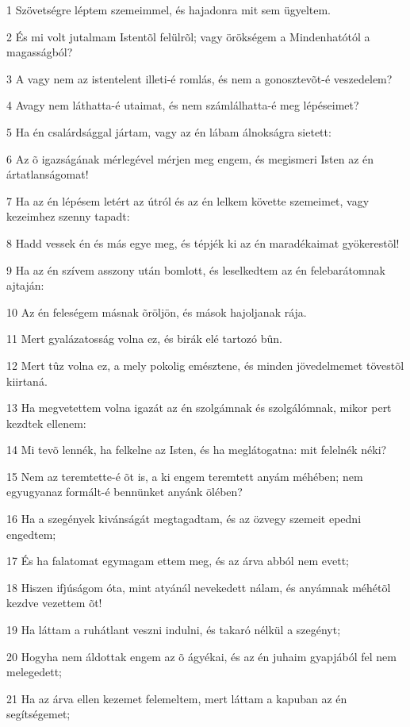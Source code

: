 \par 1 Szövetségre léptem szemeimmel, és hajadonra mit sem ügyeltem.
\par 2 És mi volt jutalmam Istentõl felülrõl; vagy örökségem a Mindenhatótól a magasságból?
\par 3 A vagy nem az istentelent illeti-é romlás, és nem a gonosztevõt-é veszedelem?
\par 4 Avagy nem láthatta-é utaimat, és nem számlálhatta-é meg lépéseimet?
\par 5 Ha én csalárdsággal jártam, vagy az én lábam álnokságra sietett:
\par 6 Az õ igazságának mérlegével mérjen meg engem, és megismeri Isten az én ártatlanságomat!
\par 7 Ha az én lépésem letért az útról és az én lelkem követte szemeimet, vagy kezeimhez szenny tapadt:
\par 8 Hadd vessek én és más egye meg, és tépjék ki az én maradékaimat gyökerestõl!
\par 9 Ha az én szívem asszony után bomlott, és leselkedtem az én felebarátomnak ajtaján:
\par 10 Az én feleségem másnak õröljön, és mások hajoljanak rája.
\par 11 Mert gyalázatosság volna ez, és birák elé tartozó bûn.
\par 12 Mert tûz volna ez, a mely pokolig emésztene, és minden jövedelmemet tövestõl kiirtaná.
\par 13 Ha megvetettem volna igazát az én szolgámnak és szolgálómnak, mikor pert kezdtek ellenem:
\par 14 Mi tevõ lennék, ha felkelne az Isten, és ha meglátogatna: mit felelnék néki?
\par 15 Nem az teremtette-é õt is, a ki engem teremtett anyám méhében; nem egyugyanaz formált-é bennünket anyánk ölében?
\par 16 Ha a szegények kivánságát megtagadtam, és az özvegy  szemeit epedni engedtem;
\par 17 És ha falatomat egymagam ettem meg, és az árva abból nem evett;
\par 18 Hiszen ifjúságom óta, mint atyánál nevekedett nálam, és anyámnak méhétõl kezdve vezettem õt!
\par 19 Ha láttam a ruhátlant veszni indulni, és takaró nélkül a szegényt;
\par 20 Hogyha nem áldottak engem az õ ágyékai, és az én juhaim gyapjából fel nem melegedett;
\par 21 Ha az árva ellen kezemet felemeltem, mert láttam a kapuban az én segítségemet;
